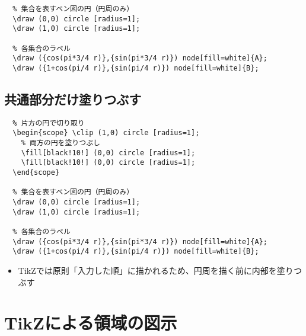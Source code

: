 \documentclass[16pt,b5paper]{article}
\begin{document}
\begin{lstlisting}
  % 集合を表すベン図の円（円周のみ）
  \draw (0,0) circle [radius=1];
  \draw (1,0) circle [radius=1];
  
  % 各集合のラベル
  \draw ({cos(pi*3/4 r)},{sin(pi*3/4 r)}) node[fill=white]{A};
  \draw ({1+cos(pi/4 r)},{sin(pi/4 r)}) node[fill=white]{B};
\end{lstlisting}

\subsection{共通部分だけ塗りつぶす}


\begin{lstlisting}
  % 片方の円で切り取り
  \begin{scope} \clip (1,0) circle [radius=1];
    % 両方の円を塗りつぶし
    \fill[black!10!] (0,0) circle [radius=1];
    \fill[black!10!] (0,0) circle [radius=1];
  \end{scope}

  % 集合を表すベン図の円（円周のみ）
  \draw (0,0) circle [radius=1];
  \draw (1,0) circle [radius=1];

  % 各集合のラベル
  \draw ({cos(pi*3/4 r)},{sin(pi*3/4 r)}) node[fill=white]{A};
  \draw ({1+cos(pi/4 r)},{sin(pi/4 r)}) node[fill=white]{B};
\end{lstlisting}

\begin{itemize}
  \item TikZでは原則「入力した順」に描かれるため、円周を描く前に内部を塗りつぶす
\end{itemize}

\section{TikZによる領域の図示}
\end{document}
